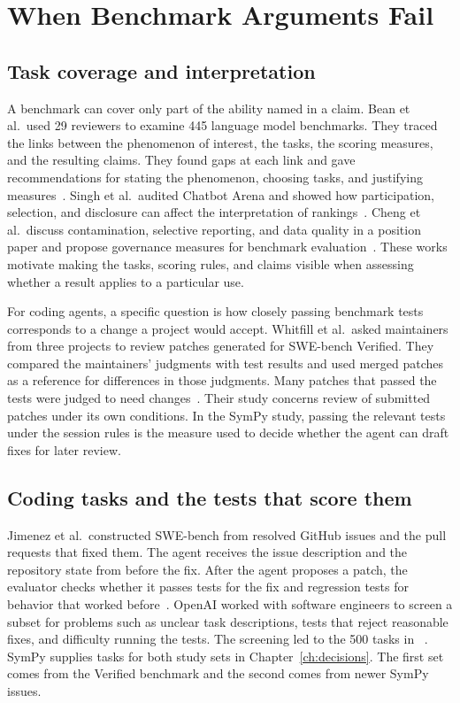 \section{When Benchmark Arguments Fail}
\label{sec:bg_failures}

\subsection{Task coverage and interpretation}

A benchmark can cover only part of the ability named in a claim. Bean et al.\ used 29 reviewers to examine 445 language model benchmarks. They traced the links between the phenomenon of interest, the tasks, the scoring measures, and the resulting claims. They found gaps at each link and gave recommendations for stating the phenomenon, choosing tasks, and justifying measures~\cite{bean_measuring_what_matters}. Singh et al.\ audited Chatbot Arena and showed how participation, selection, and disclosure can affect the interpretation of rankings~\cite{singh_leaderboard_illusion}. Cheng et al.\ discuss contamination, selective reporting, and data quality in a position paper and propose governance measures for benchmark evaluation~\cite{cheng_benchmarking_broken}. These works motivate making the tasks, scoring rules, and claims visible when assessing whether a result applies to a particular use.

For coding agents, a specific question is how closely passing benchmark tests corresponds to a change a project would accept. Whitfill et al.\ asked maintainers from three projects to review patches generated for SWE-bench Verified. They compared the maintainers' judgments with test results and used merged patches as a reference for differences in those judgments. Many patches that passed the tests were judged to need changes~\cite{whitfill_metr_merge_2026}. Their study concerns review of submitted patches under its own conditions. In the SymPy study, passing the relevant tests under the session rules is the measure used to decide whether the agent can draft fixes for later review.

\subsection{Coding tasks and the tests that score them}

Jimenez et al.\ constructed SWE-bench from resolved GitHub issues and the pull requests that fixed them. The agent receives the issue description and the repository state from before the fix. After the agent proposes a patch, the evaluator checks whether it passes tests for the fix and regression tests for behavior that worked before~\cite{jimenez_swebench_2024}. OpenAI worked with software engineers to screen a subset for problems such as unclear task descriptions, tests that reject reasonable fixes, and difficulty running the tests. The screening led to the 500 tasks in \swebench{}~\cite{openai_swebench_verified_2024}. SymPy supplies tasks for both study sets in Chapter~\ref{ch:decisions}. The first set comes from the Verified benchmark and the second comes from newer SymPy issues.

